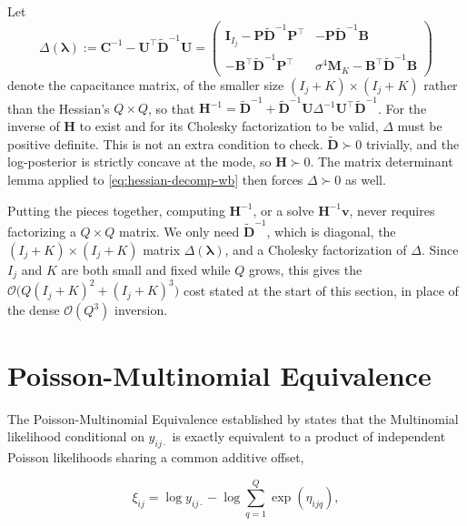 Let
\begin{equation}
    \Delta\left(\bm{\lambda}\right):= \mathbf{C}^{-1} - \mathbf{U}^{\top}\tilde{\mathbf{D}}^{-1}\mathbf{U}
= \begin{pmatrix}
\mathbf{I}_{I_{j}} - \mathbf{P}\tilde{\mathbf{D}}^{-1}\mathbf{P}^{\top} & -\mathbf{P}\tilde{\mathbf{D}}^{-1}\mathbf{B} \\
-\mathbf{B}^{\top}\tilde{\mathbf{D}}^{-1}\mathbf{P}^{\top} & \sigma^4\mathbf{M}_K - \mathbf{B}^{\top}\tilde{\mathbf{D}}^{-1}\mathbf{B}
\end{pmatrix}
    \label{eq:capacitance}
\end{equation}
denote the capacitance matrix, of the smaller size $(I_{j}+K)\times (I_{j}+K)$ rather than the Hessian's $Q\times Q$, so that $\mathbf{H}^{-1}=\tilde{\mathbf{D}}^{-1}+\tilde{\mathbf{D}}^{-1}\mathbf{U}\Delta^{-1}\mathbf{U}^{\top}\tilde{\mathbf{D}}^{-1}$. For the inverse of $\mathbf H$ to exist and for its Cholesky factorization to be valid, $\Delta$ must be positive definite. This is not an extra condition to check. $\tilde{\mathbf D}\succ 0$ trivially, and the log-posterior is strictly concave at the mode, so $\mathbf H\succ 0$. The matrix determinant lemma applied to \eqref{eq:hessian-decomp-wb} then forces $\Delta\succ 0$ as well.

Putting the pieces together, computing $\mathbf{H}^{-1}$, or a solve $\mathbf{H}^{-1}\bm v$, never requires factorizing a $Q\times Q$ matrix. We only need $\tilde{\mathbf D}^{-1}$, which is diagonal, the $(I_j+K)\times(I_j+K)$ matrix $\Delta(\bm\lambda)$, and a Cholesky factorization of $\Delta$. Since $I_j$ and $K$ are both small and fixed while $Q$ grows, this gives the $\mathcal O\big(Q(I_j+K)^2+(I_j+K)^3\big)$ cost stated at the start of this section, in place of the dense $\mathcal O(Q^3)$ inversion.

\section{Poisson-Multinomial Equivalence}
\label{sec:PME}
    
The Poisson-Multinomial Equivalence established by \citet{Baker1994} states that the Multinomial likelihood conditional on $y_{ij\cdot}$ is exactly equivalent to a product of independent Poisson likelihoods sharing a common additive offset,

\begin{equation}
    \xi_{ij} = \log y_{ij\cdot} - \log\sum_{q=1}^Q \exp(\eta_{ijq}),
    \label{eq:xi_baker}
\end{equation}

